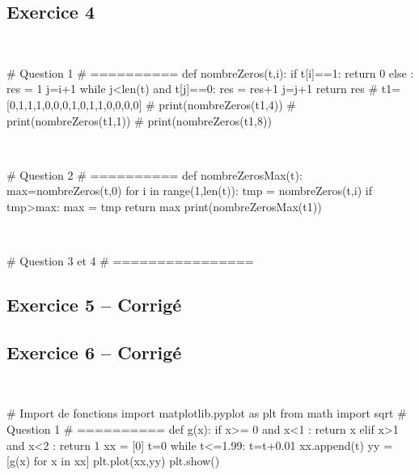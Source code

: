 \documentclass[10pt,fleqn]{article} %
\begin{document}
\begin{multicols}{2}
\vfill

\columnbreak

\subsection*{Exercice 4}
\begin{corrige}
$\quad$
\begin{python}
# Question 1 
# ==========
def nombreZeros(t,i):
    if t[i]==1:
        return 0
    else : 
        res = 1
        j=i+1
        while j<len(t) and t[j]==0:
            res = res+1
            j=j+1
    return res
# t1=[0,1,1,1,0,0,0,1,0,1,1,0,0,0,0]
# print(nombreZeros(t1,4))
# print(nombreZeros(t1,1))
# print(nombreZeros(t1,8))
\end{python}
\end{corrige}

\begin{corrige}
$\quad$
\begin{python}
# Question 2
# ==========
def nombreZerosMax(t):
    max=nombreZeros(t,0)
    for i in range(1,len(t)):
        tmp = nombreZeros(t,i)
        if tmp>max:
            max = tmp
    return max
print(nombreZerosMax(t1))
\end{python}
\end{corrige}

\begin{corrige}
$\quad$
\begin{python}
# Question 3 et 4
# ================
\end{python}
\end{corrige}
\newpage

\subsection*{Exercice 5 -- Corrigé}

\columnbreak 

\subsection*{Exercice 6 -- Corrigé}
\begin{corrige}
$\quad$
\begin{python}
# Import de fonctions
import matplotlib.pyplot as plt
from math import sqrt
# Question 1 
# ==========
def g(x):
    if x>= 0 and x<1 :
        return x
    elif x>1 and x<2 :
        return 1
xx = [0]
t=0
while t<=1.99:
    t=t+0.01
    xx.append(t)
yy = [g(x) for x in xx]
plt.plot(xx,yy)
plt.show()
\end{python}
\end{corrige}


\end{multicols}
\end{document}
